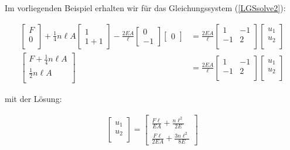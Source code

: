 Im vorliegenden Beispiel erhalten wir für das Gleichungssystem (\ref{LGSsolve2}):

\begin{align}
\begin{bmatrix}
F \\
0 \\
\end{bmatrix} + \frac{1}{4}n\ell A \begin{bmatrix}
1 \\
1+1
\end{bmatrix} - \frac{2EA}{\ell}\begin{bmatrix}
 0\\
-1
\end{bmatrix} \begin{bmatrix}
0
\end{bmatrix} & = \frac{2EA}{\ell}\begin{bmatrix}
1 & -1\\
-1 & 2 \\
\end{bmatrix} \begin{bmatrix}
u_1 \\
u_2\\
\end{bmatrix} \\
\begin{bmatrix}
F +\frac{1}{4}n\ell A \\
\frac{1}{2}n\ell A \\
\end{bmatrix} & =
\frac{2EA}{\ell}\begin{bmatrix}
1 & -1\\
-1 & 2 \\
\end{bmatrix} \begin{bmatrix}
u_1 \\
u_2\\
\end{bmatrix} 
\end{align}

mit der Lösung:

\begin{align}
\begin{bmatrix}
u_1 \\
u_2\\
\end{bmatrix} = \begin{bmatrix}
 \frac{F\ell}{EA} + \frac{n \ell^2}{2E}\\
\frac{F\ell}{2EA} + \frac{3 n \ell^2}{8E}
\end{bmatrix} 
\end{align}

